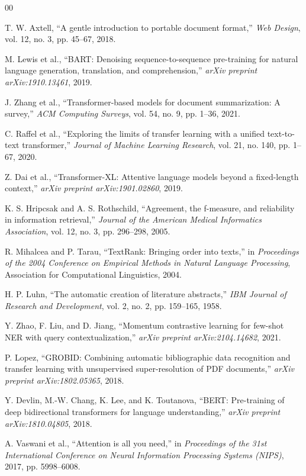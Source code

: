 \documentclass[conference]{IEEEtran}
\begin{document}
\begin{thebibliography}{00}

 T. W. Axtell, ``A gentle introduction to portable document format,'' \textit{Web Design}, vol. 12, no. 3, pp. 45--67, 2018.

 M. Lewis et al., ``BART: Denoising sequence-to-sequence pre-training for natural language generation, translation, and comprehension,'' \textit{arXiv preprint arXiv:1910.13461}, 2019.

 J. Zhang et al., ``Transformer-based models for document summarization: A survey,'' \textit{ACM Computing Surveys}, vol. 54, no. 9, pp. 1--36, 2021.

 C. Raffel et al., ``Exploring the limits of transfer learning with a unified text-to-text transformer,'' \textit{Journal of Machine Learning Research}, vol. 21, no. 140, pp. 1--67, 2020.

 Z. Dai et al., ``Transformer-XL: Attentive language models beyond a fixed-length context,'' \textit{arXiv preprint arXiv:1901.02860}, 2019.

 K. S. Hripcsak and A. S. Rothschild, ``Agreement, the f-measure, and reliability in information retrieval,'' \textit{Journal of the American Medical Informatics Association}, vol. 12, no. 3, pp. 296--298, 2005.

 R. Mihalcea and P. Tarau, ``TextRank: Bringing order into texts,'' in \textit{Proceedings of the 2004 Conference on Empirical Methods in Natural Language Processing}, Association for Computational Linguistics, 2004.

 H. P. Luhn, ``The automatic creation of literature abstracts,'' \textit{IBM Journal of Research and Development}, vol. 2, no. 2, pp. 159--165, 1958.

 Y. Zhao, F. Liu, and D. Jiang, ``Momentum contrastive learning for few-shot NER with query contextualization,'' \textit{arXiv preprint arXiv:2104.14682}, 2021.

 P. Lopez, ``GROBID: Combining automatic bibliographic data recognition and transfer learning with unsupervised super-resolution of PDF documents,'' \textit{arXiv preprint arXiv:1802.05365}, 2018.

 Y. Devlin, M.-W. Chang, K. Lee, and K. Toutanova, ``BERT: Pre-training of deep bidirectional transformers for language understanding,'' \textit{arXiv preprint arXiv:1810.04805}, 2018.

 A. Vaswani et al., ``Attention is all you need,'' in \textit{Proceedings of the 31st International Conference on Neural Information Processing Systems (NIPS)}, 2017, pp. 5998--6008.


\end{thebibliography}
\end{document}

